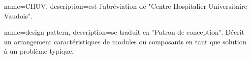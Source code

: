 \makeglossaries

{
	name=CHUV,
	description={est l'abréviation de "Centre Hospitalier Universitaire Vaudois".}
}

{
	name=design pattern,
	description={se traduit en "Patron de conception". Décrit un arrangement caractéristiques de modules ou composants en tant que solution à un problème typique.}
}

